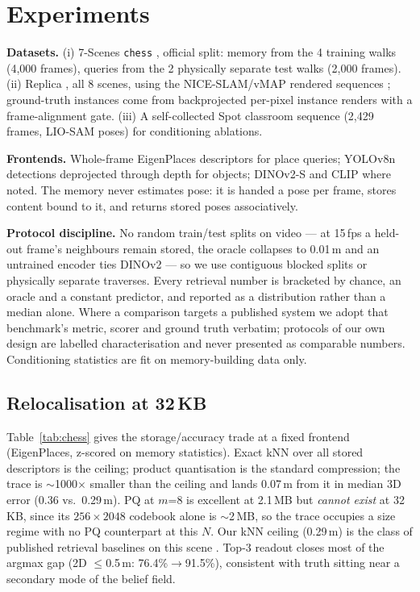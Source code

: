 \documentclass[conference]{IEEEtran}
\begin{document}
\section{Experiments}
\label{sec:results}

\textbf{Datasets.} (i) 7-Scenes \texttt{chess} \cite{shotton2013scene},
official split: memory from the 4 training walks (4{,}000 frames),
queries from the 2 physically separate test walks (2{,}000 frames).
(ii) Replica \cite{straub2019replica}, all 8 scenes, using the
NICE-SLAM/vMAP rendered sequences \cite{zhu2022niceslam,kong2023vmap};
ground-truth instances come from backprojected per-pixel instance
renders with a frame-alignment gate. (iii) A self-collected Spot
classroom sequence (2{,}429 frames, LIO-SAM poses) for conditioning
ablations.

\textbf{Frontends.} Whole-frame EigenPlaces descriptors
\cite{berton2023eigenplaces} for place queries; YOLOv8n
\cite{jocher2023yolov8} detections deprojected through depth for objects;
DINOv2-S \cite{oquab2023dinov2} and CLIP \cite{radford2021clip} where
noted. The memory never estimates pose: it is handed a pose per frame,
stores content bound to it, and returns stored poses associatively.

\textbf{Protocol discipline.} No random train/test splits on video --- at
15\,fps a held-out frame's neighbours remain stored, the oracle collapses
to 0.01\,m and an untrained encoder ties DINOv2 --- so we use contiguous
blocked splits or physically separate traverses. Every retrieval number
is bracketed by chance, an oracle and a constant predictor, and reported
as a distribution rather than a median alone. Where a comparison targets
a published system we adopt that benchmark's metric, scorer and ground
truth verbatim; protocols of our own design are labelled characterisation
and never presented as comparable numbers. Conditioning statistics are
fit on memory-building data only.

\subsection{Relocalisation at 32\,KB}
\label{sec:chess}

Table~\ref{tab:chess} gives the storage/accuracy trade at a fixed
frontend (EigenPlaces, z-scored on memory statistics). Exact kNN over all
stored descriptors is the ceiling; product quantisation
\cite{jegou2011product} is the standard compression; the trace is
$\sim$1000$\times$ smaller than the ceiling and lands 0.07\,m from it in
median 3D error (0.36 vs.\ 0.29\,m). PQ at $m$=8 is excellent at 2.1\,MB but \emph{cannot exist} at
32\,KB, since its $256\times2048$ codebook alone is $\sim$2\,MB, so the
trace occupies a size regime with no PQ counterpart at this $N$. Our kNN
ceiling (0.29\,m) is the class of published retrieval baselines on this
scene \cite{sattler2019understanding}. Top-3 readout closes most of the
argmax gap
(2D $\le$0.5\,m: 76.4\%$\to$91.5\%), consistent with truth sitting near a
secondary mode of the belief field.
\end{document}
